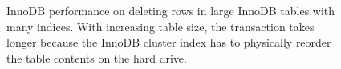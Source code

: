 \begin{figure}[h]
	\centering
	\def\svgwidth{0.4\textwidth}
	
	\caption[Deletion time on large InnoDB tables]{
		InnoDB performance on deleting rows in large InnoDB tables with many
		indices. With increasing table size, the transaction takes longer because
		the InnoDB cluster index has to physically reorder the table contents on the
		hard drive.
	}
	\label{fig:delete-time}
\end{figure}
